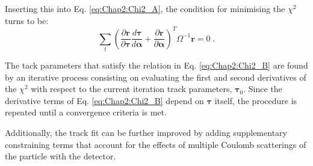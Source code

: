Inserting this into Eq. \ref{eq:Chap2:Chi2_A}, the condition for minimising the $\chi^{2}$ turns 
to be:
\begin{equation}\label{eq:Chap2:Chi2_B}
	\sum_{t} \left(\frac{\partial  \bm{r} }{\partial \bm{\tau}} \frac{d  \bm{\tau} }{d \bm{\alpha}} + 
	  \frac{\partial  \bm{r} }{\partial \bm{\alpha}} \right)^{T} \Omega^{-1} \bm{r} = 0 \; .
\end{equation}
\begin{comment}
Here, the term $d\bm{\tau} / d\bm{\alpha}$ is of particular importance since its contains
the relationship between the track and alignment parameters, and it will determine 
the difference between the \textit{Local}  and \textit{Global} $\chi^{2}$ algorithms.

If the algorithm assumes that track parameters do not depend on the alignment, i.e.
$d\bm{\tau} / d\bm{\alpha} = 0$, it is the so-called \textit{Local} $\chi^{2}$ algorithm.
On the other hand, the \textit{Global} $\chi^{2}$ is based on the assumption that 
the track and alignment parameters are dependent. 
\end{comment}


The tack parameters that satisfy the relation in Eq. \ref{eq:Chap2:Chi2_B} are found 
by an iterative process consisting on evaluating the first and second derivatives
of the $\chi^{2}$ with respect to the current iteration track parameters, $\bm{\tau}_{0}$.
Since the derivative terms of Eq. \ref{eq:Chap2:Chi2_B} depend on $\bm{\tau}$ itself, 
 the procedure is repeated until a convergence criteria is met.
 
 Additionally, the track fit can be further improved by adding supplementary constraining terms that account 
 for the effects of multiple Coulomb scatterings of the particle with the detector.





